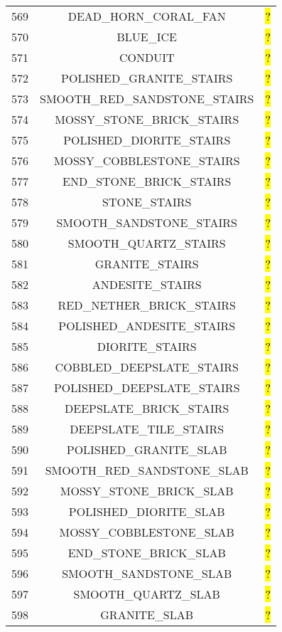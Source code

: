 \documentclass[11pt]{article}
\newcommand\myworries[1]{\sethlcolor{red}\hl{#1}}
\begin{document}
\begin{longtable}{ |c|c|c| }
	569 & DEAD\_HORN\_CORAL\_FAN & \myworries{?} \\
	570 & BLUE\_ICE & \myworries{?} \\
	571 & CONDUIT & \myworries{?} \\
	572 & POLISHED\_GRANITE\_STAIRS & \myworries{?} \\
	573 & SMOOTH\_RED\_SANDSTONE\_STAIRS & \myworries{?} \\
	574 & MOSSY\_STONE\_BRICK\_STAIRS & \myworries{?} \\
	575 & POLISHED\_DIORITE\_STAIRS & \myworries{?} \\
	576 & MOSSY\_COBBLESTONE\_STAIRS & \myworries{?} \\
	577 & END\_STONE\_BRICK\_STAIRS & \myworries{?} \\
	578 & STONE\_STAIRS & \myworries{?} \\
	579 & SMOOTH\_SANDSTONE\_STAIRS & \myworries{?} \\
	580 & SMOOTH\_QUARTZ\_STAIRS & \myworries{?} \\
	581 & GRANITE\_STAIRS & \myworries{?} \\
	582 & ANDESITE\_STAIRS & \myworries{?} \\
	583 & RED\_NETHER\_BRICK\_STAIRS & \myworries{?} \\
	584 & POLISHED\_ANDESITE\_STAIRS & \myworries{?} \\
	585 & DIORITE\_STAIRS & \myworries{?} \\
	586 & COBBLED\_DEEPSLATE\_STAIRS & \myworries{?} \\
	587 & POLISHED\_DEEPSLATE\_STAIRS & \myworries{?} \\
	588 & DEEPSLATE\_BRICK\_STAIRS & \myworries{?} \\
	589 & DEEPSLATE\_TILE\_STAIRS & \myworries{?} \\
	590 & POLISHED\_GRANITE\_SLAB & \myworries{?} \\
	591 & SMOOTH\_RED\_SANDSTONE\_SLAB & \myworries{?} \\
	592 & MOSSY\_STONE\_BRICK\_SLAB & \myworries{?} \\
	593 & POLISHED\_DIORITE\_SLAB & \myworries{?} \\
	594 & MOSSY\_COBBLESTONE\_SLAB & \myworries{?} \\
	595 & END\_STONE\_BRICK\_SLAB & \myworries{?} \\
	596 & SMOOTH\_SANDSTONE\_SLAB & \myworries{?} \\
	597 & SMOOTH\_QUARTZ\_SLAB & \myworries{?} \\
	598 & GRANITE\_SLAB & \myworries{?} \\

\end{longtable}
\end{document}
